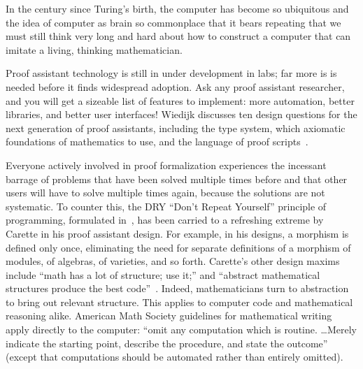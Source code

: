 \documentclass{llncs}
\def\princ#1{\smallskip\hfill\break\smallskip\centerline{\it #1\hfill}}
\begin{document}
In the century since Turing's birth, the computer has become so
ubiquitous and the idea of computer as brain so commonplace that it
bears repeating that we must still think very long and hard about how
to construct a computer that can imitate a living, thinking
mathematician.  


Proof assistant technology is still in under development in labs; far
more is is needed before it finds widespread adoption.  Ask any proof
assistant researcher, and you will get a sizeable list of features to
implement: more automation, better libraries, and better user
interfaces!  Wiedijk discusses ten design questions for the next
generation of proof assistants, including the type system, which
axiomatic foundations of mathematics to use, and the language of proof
scripts~\cite{Wie10}.  

Everyone actively involved in proof formalization experiences the
incessant barrage of problems that have been solved multiple times
before and that other users will have to solve multiple times again,
because the solutions are not systematic.  To counter this, the DRY
``Don't Repeat Yourself'' principle of programming, formulated
in~\cite{PP00}, has been carried to a refreshing extreme by Carette in
his proof assistant design.  For example, in his designs, a morphism
is defined only once, eliminating the need for separate definitions of
a morphism of modules, of algebras, of varieties, and so forth.
Carette's other design maxims include ``math has a lot of structure;
use it;'' and ``abstract mathematical structures produce the best
code''~\cite{Car28p}.  Indeed, mathematicians turn to abstraction to
bring out relevant structure. This applies to computer code and
mathematical reasoning alike.  American Math Society guidelines for
mathematical writing apply directly to the computer: ``omit any
computation which is routine. \dots Merely indicate the starting
point, describe the procedure, and state the outcome''~\cite{DCFPS}
(except that computations should be automated rather than entirely
omitted).




\end{document}
